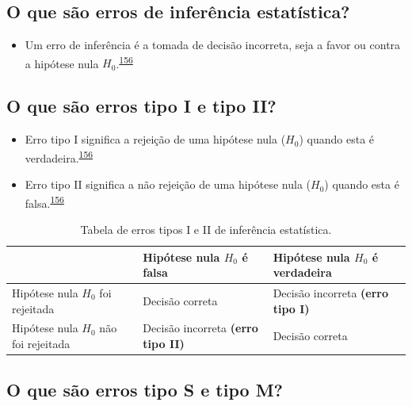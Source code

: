 \documentclass[
  a4paper,
]{book}
\providecommand{\tightlist}{%
  \setlength{\itemsep}{0pt}\setlength{\parskip}{0pt}}
\begin{document}
\hypertarget{o-que-suxe3o-erros-de-inferuxeancia-estatuxedstica}{%
\subsection{O que são erros de inferência estatística?}\label{o-que-suxe3o-erros-de-inferuxeancia-estatuxedstica}}

\begin{itemize}
\tightlist
\item
  Um erro de inferência é a tomada de decisão incorreta, seja a favor ou contra a hipótese nula \(H_{0}\).\textsuperscript{\protect\hyperlink{ref-Curran-Everett2009}{156}}
\end{itemize}

\hypertarget{o-que-suxe3o-erros-tipo-i-e-tipo-ii}{%
\subsection{O que são erros tipo I e tipo II?}\label{o-que-suxe3o-erros-tipo-i-e-tipo-ii}}

\begin{itemize}
\item
  Erro tipo I significa a rejeição de uma hipótese nula (\(H_{0}\)) quando esta é verdadeira.\textsuperscript{\protect\hyperlink{ref-Curran-Everett2009}{156}}
\item
  Erro tipo II significa a não rejeição de uma hipótese nula (\(H_{0}\)) quando esta é falsa.\textsuperscript{\protect\hyperlink{ref-Curran-Everett2009}{156}}
\end{itemize}

\begin{table}

\caption{\label{tab:erros-inferencia-I-II}Tabela de erros tipos I e II de inferência estatística.}
\centering
\begin{tabu} to 
\toprule
  & Hipótese nula $H_{0}$ 
 é falsa & Hipótese nula $H_{0}$ 
\textbf{ é verdadeira}\\
\midrule
Hipótese nula $H_{0}$ 
 foi rejeitada & Decisão correta & Decisão incorreta 
\textbf{ (erro tipo I)}\\
Hipótese nula $H_{0}$ 
 não foi rejeitada & Decisão incorreta 
\textbf{ (erro tipo II)} & Decisão correta\\
\bottomrule
\end{tabu}
\end{table}

\hypertarget{o-que-suxe3o-erros-tipo-s-e-tipo-m}{%
\subsection{O que são erros tipo S e tipo M?}\label{o-que-suxe3o-erros-tipo-s-e-tipo-m}}
\end{document}
